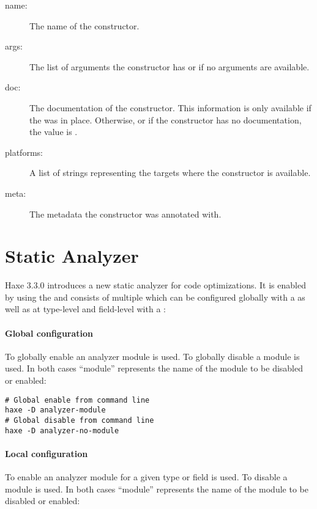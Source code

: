 \begin{description}
	\item[name:] The name of the constructor.
	\item[args:] The list of arguments the constructor has or  if no arguments are available.
	\item[doc:] The documentation of the constructor. This information is only available if the   was in place. Otherwise, or if the constructor has no documentation, the value is .
	\item[platforms:] A list of strings representing the targets where the constructor is available.
	\item[meta:] The metadata the constructor was annotated with.
\end{description}



\section{Static Analyzer}
\label{cr-static-analyzer}

Haxe 3.3.0 introduces a new static analyzer for code optimizations. It is enabled by using the   and consists of multiple  which can be configured globally with a  as well as at type-level and field-level with a :

\paragraph{Global configuration}
\label{cr-static-analyzer-global-configuration}

To globally enable an analyzer module  is used. To globally disable a module  is used. In both cases ``module'' represents the name of the module to be disabled or enabled:

\begin{lstlisting}
# Global enable from command line
haxe -D analyzer-module
# Global disable from command line
haxe -D analyzer-no-module
\end{lstlisting}

\paragraph{Local configuration}
\label{cr-static-analyzer-local-configuration}
To enable an analyzer module for a given type or field  is used. To disable a module  is used. In both cases ``module'' represents the name of the module to be disabled or enabled:

